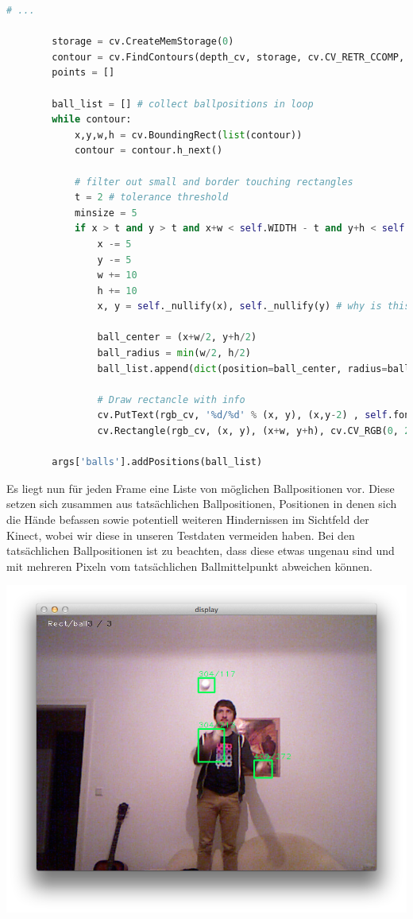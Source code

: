 \documentclass[12pt,a4paper,ngerman]{scrartcl}
\begin{document}
\begin{lstlisting}[language=Python,caption={RectsFilter.py, Ausschnitt}]
# ...

        storage = cv.CreateMemStorage(0)
        contour = cv.FindContours(depth_cv, storage, cv.CV_RETR_CCOMP, cv.CV_CHAIN_APPROX_SIMPLE)
        points = []

        ball_list = [] # collect ballpositions in loop
        while contour:
            x,y,w,h = cv.BoundingRect(list(contour))
            contour = contour.h_next()

            # filter out small and border touching rectangles
            t = 2 # tolerance threshold
            minsize = 5
            if x > t and y > t and x+w < self.WIDTH - t and y+h < self.HEIGHT - t and w > minsize and h > minsize:
                x -= 5
                y -= 5
                w += 10
                h += 10
                x, y = self._nullify(x), self._nullify(y) # why is this necessary now?

                ball_center = (x+w/2, y+h/2)
                ball_radius = min(w/2, h/2)
                ball_list.append(dict(position=ball_center, radius=ball_radius))

                # Draw rectancle with info
                cv.PutText(rgb_cv, '%d/%d' % (x, y), (x,y-2) , self.font, (0, 255, 0))
                cv.Rectangle(rgb_cv, (x, y), (x+w, y+h), cv.CV_RGB(0, 255,0), 2)

        args['balls'].addPositions(ball_list)
\end{lstlisting}

Es liegt nun
für jeden Frame eine Liste von möglichen Ballpositionen vor. Diese setzen sich 
zusammen aus tatsächlichen Ballpositionen, Positionen in denen sich die Hände befassen sowie potentiell weiteren Hindernissen im Sichtfeld der Kinect, wobei wir diese in unseren Testdaten vermeiden haben. Bei den tatsächlichen Ballpositionen ist zu beachten, dass diese etwas ungenau sind und mit mehreren Pixeln vom tatsächlichen Ballmittelpunkt abweichen können.

\includegraphics[scale=0.5]{img/rects-1.png}
\end{document}
